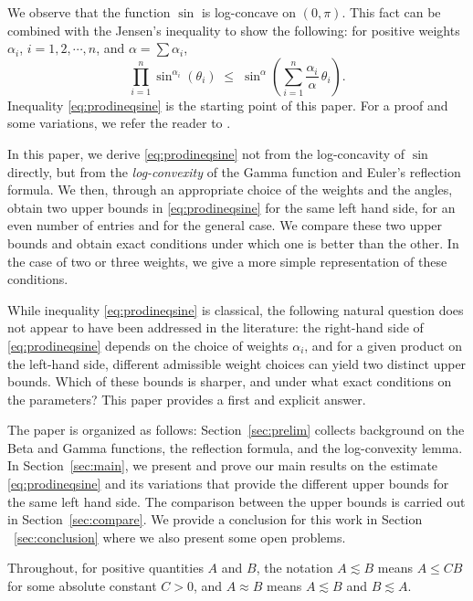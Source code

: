\documentclass[12pt]{amsart}
\theoremstyle{definition}
\begin{document}
We observe that the function $\sin$ is log-concave on $(0,\pi)$. This fact can be combined with the Jensen's inequality to show the following: 
for positive weights $\alpha_i$, $i=1,2,\cdots,n$, and $\alpha=\sum\alpha_i$,
\begin{equation}\label{eq:prodineqsine}
  \prod_{i=1}^{n}\sin^{\alpha_i}(\theta_i)
  \;\leq\;
  \sin^{\alpha}\!\left(\sum_{i=1}^n\frac{\alpha_i}{\alpha}\,\theta_i\right).
\end{equation}
Inequality \eqref{eq:prodineqsine} is the starting point of this
paper. For a proof and some variations, we refer the reader to
\cite{AVV1997,Bullen2003,CP2014,Mitrinovic1970,MPF1993,NS2010}. 

In this paper, we derive \eqref{eq:prodineqsine} not from the log-concavity of $\sin$ directly, but from the \emph{log-convexity} of the Gamma function and Euler's reflection formula. We then, through an appropriate choice of the weights and the angles, obtain two upper bounds in \eqref{eq:prodineqsine} for the same left hand side, for an even number of entries and for the general case. We compare these two upper bounds and obtain exact conditions under which one is better than the other. In the case of two or three weights, we give a more simple representation of these conditions.

While inequality \eqref{eq:prodineqsine} is classical, the following natural question does not appear to have been addressed in the literature: the right-hand side of \eqref{eq:prodineqsine} depends on the choice of weights $\alpha_i$, and for a given product on the left-hand side, different admissible weight choices can yield two distinct upper bounds. Which of these bounds is sharper, and under what exact conditions on the parameters? This paper provides a first and explicit answer.

The paper is organized as follows: Section~\ref{sec:prelim} collects background on the Beta and Gamma functions, the reflection formula, and the log-convexity lemma. In Section~\ref{sec:main}, we present and prove our main results on the estimate \eqref{eq:prodineqsine} and its variations that provide the different upper bounds for the same left hand side. The comparison between the upper bounds is carried out in Section~\ref{sec:compare}. We provide a conclusion for this work in  Section ~\ref{sec:conclusion} where we also present some open problems.

Throughout, for positive quantities
$A$ and $B$, the notation $A\lesssim B$ means $A\leq CB$ for some
absolute constant $C>0$, and $A\approx B$ means $A\lesssim B$
and $B\lesssim A$.
\end{document}
